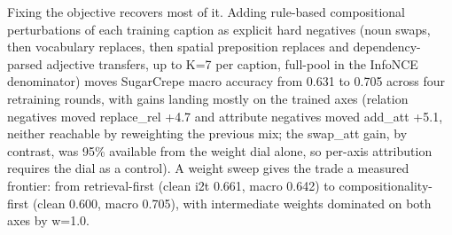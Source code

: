 \documentclass[
  11pt,
]{article}
\begin{document}
Fixing the objective recovers most of it. Adding rule-based
compositional perturbations of each training caption as explicit hard
negatives (noun swaps, then vocabulary replaces, then spatial
preposition replaces and dependency-parsed adjective transfers, up to
K=7 per caption, full-pool in the InfoNCE denominator) moves SugarCrepe
macro accuracy from 0.631 to 0.705 across four retraining rounds, with
gains landing mostly on the trained axes (relation negatives moved
replace\_rel +4.7 and attribute negatives moved add\_att +5.1, neither
reachable by reweighting the previous mix; the swap\_att gain, by
contrast, was 95\% available from the weight dial alone, so per-axis
attribution requires the dial as a control). A weight sweep gives the
trade a measured frontier: from retrieval-first (clean i2t 0.661, macro
0.642) to compositionality-first (clean 0.600, macro 0.705), with
intermediate weights dominated on both axes by w=1.0.
\end{document}
